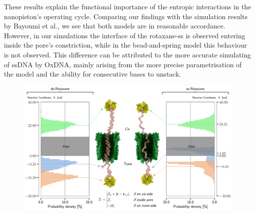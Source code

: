 These results explain the functional importance of the entropic interactions in the
nanopiston's operating cycle. Comparing our findings with the simulation results by
Bayoumi et al.,
we see that both models are in reasonable accordance. However, in our simulations the
interface of the rotaxane-ss is observed entering inside the pore's constriction, while
in the bead-and-spring model this behaviour is not observed. This difference can be
attributed to the more accurate simulating of ssDNA by OxDNA, mainly arising from the
more precise parametrisation of the model and the ability for consecutive bases to
unstack.

\begin{figure}[ht!]
\begin{center}
  \includegraphics[width=1\textwidth]{Figures/image.png}
\end{center}
\label{fig:conform}
\end{figure}
